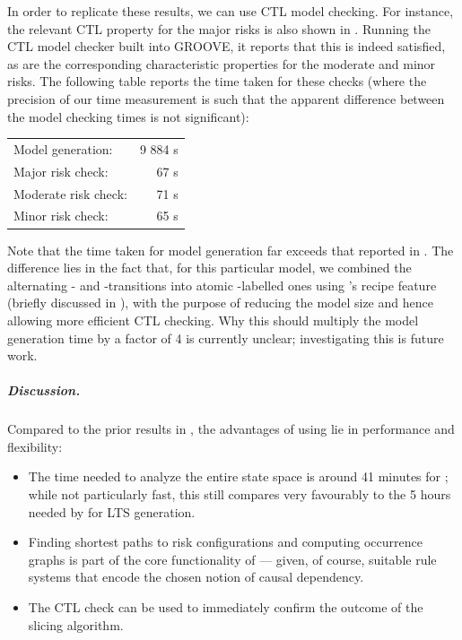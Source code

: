 In order to replicate these results, we can use CTL model checking. For instance, the relevant CTL property for the major risks is also shown in . Running the CTL model checker built into GROOVE, it reports that this is indeed satisfied, as are the corresponding characteristic properties for the moderate and minor risks. The following table reports the time taken for these checks (where the precision of our time measurement is such that the apparent difference between the model checking times is not significant):

\begin{center}
\begin{tabular}{lr}
Model generation: & 9 884 s \\
Major risk check: & 67 s \\
Moderate risk check: & 71 s \\
Minor risk check: & 65 s \\
\end{tabular}
\end{center}
%
Note that the time taken for model generation far exceeds that reported in . The difference lies in the fact that, for this particular model, we combined the alternating \contextR- and \reactR-transitions into atomic \fireR-labelled ones using \GROOVE's recipe feature (briefly discussed in ), with the purpose of reducing the model size and hence allowing more efficient CTL checking. Why this should multiply the model generation time by a factor of 4 is currently unclear; investigating this is future work.

\subparagraph*{Discussion.}

Compared to the prior results in \cite{DBLP:conf/cmsb/BowlesBBFGM24}, the advantages of using \GROOVE lie in performance and flexibility:
\begin{itemize}
\item The time needed to analyze the entire state space is around 41 minutes for \GROOVE; while not particularly fast, this still compares very favourably to the 5 hours needed by \BioResolve for LTS generation.

\item Finding shortest paths to risk configurations and computing occurrence graphs is part of the core functionality of \GROOVE --- given, of course, suitable rule systems that encode the chosen notion of causal dependency.

\item The CTL check can be used to immediately confirm the outcome of the slicing algorithm.
\end{itemize}
